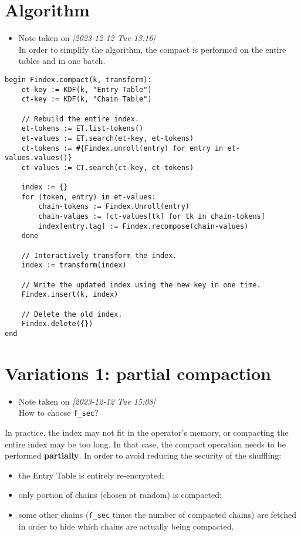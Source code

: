 \documentclass[11pt]{article}
\begin{document}
\section{Algorithm}
\label{sec:org3ca3d3c}
\begin{itemize}
\item Note taken on \textit{[2023-12-12 Tue 13:16] } \\[0pt]
In order to simplify the algorithm, the compact is performed on the entire
tables and in one batch.
\end{itemize}

\begin{verbatim}
begin Findex.compact(k, transform):
    et-key := KDF(k, "Entry Table")
    ct-key := KDF(k, "Chain Table")

    // Rebuild the entire index.
    et-tokens := ET.list-tokens()
    et-values := ET.search(et-key, et-tokens)
    ct-tokens := #{Findex.unroll(entry) for entry in et-values.values()}
    ct-values := CT.search(ct-key, ct-tokens)

    index := {}
    for (token, entry) in et-values:
        chain-tokens := Findex.Unroll(entry)
        chain-values := [ct-values[tk] for tk in chain-tokens]
        index[entry.tag] := Findex.recompose(chain-values)
    done

    // Interactively transform the index.
    index := transform(index)

    // Write the updated index using the new key in one time.
    Findex.insert(k, index)

    // Delete the old index.
    Findex.delete({})
end
\end{verbatim}

\section{Variations 1: partial compaction}
\label{sec:org7888df8}

\begin{itemize}
\item Note taken on \textit{[2023-12-12 Tue 15:08] } \\[0pt]
How to choose \texttt{f\_sec}?
\end{itemize}
In practice, the index may not fit in the operator's memory, or compacting the
entire index may be too long. In that case, the compact operation needs to be
performed \textbf{partially}. In order to avoid reducing the security of the shuffling:

\begin{itemize}
\item the Entry Table is entirely re-encrypted;
\item only portion of chains (chosen at random) is compacted;
\item some other chains (\texttt{f\_sec} times the number of compacted chains) are fetched
in order to hide which chains are actually being compacted.
\end{itemize}
\end{document}
